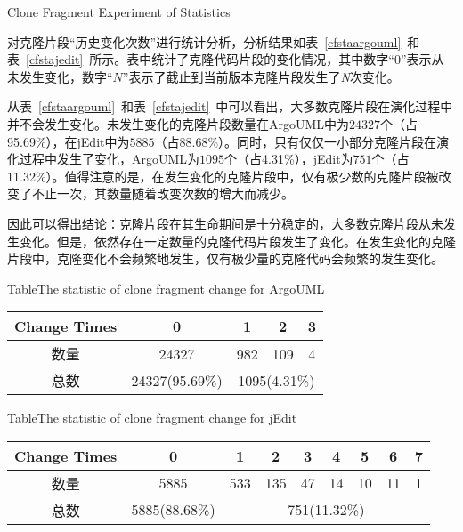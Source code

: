 {Clone Fragment Experiment of Statistics}

对克隆片段“历史变化次数”进行统计分析，分析结果如表~\ref{cfstaargouml}~和表~\ref{cfstajedit}~所示。表中统计了克隆代码片段的变化情况，其中数字“$0$”表示从未发生变化，数字“$N$”表示了截止到当前版本克隆片段发生了{\emph N\/}次变化。

从表~\ref{cfstaargouml}~和表~\ref{cfstajedit}~中可以看出，大多数克隆片段在演化过程中并不会发生变化。未发生变化的克隆片段数量在ArgoUML中为$24327$个（占95.69\%），在jEdit中为$5885$（占88.68\%）。同时，只有仅仅一小部分克隆片段在演化过程中发生了变化，ArgoUML为$1095$个（占4.31\%），jEdit为$751$个（占11.32\%）。值得注意的是，在发生变化的克隆片段中，仅有极少数的克隆片段被改变了不止一次，其数量随着改变次数的增大而减少。

 因此可以得出结论：克隆片段在其生命期间是十分稳定的，大多数克隆片段从未发生变化。但是，依然存在一定数量的克隆代码片段发生了变化。在发生变化的克隆片段中，克隆变化不会频繁地发生，仅有极少量的克隆代码会频繁的发生变化。

\begin{table}[htbp]
{Table$\!$}{The statistic of clone fragment change for ArgoUML}
\vspace{0.5em}
\centering
\wuhao
\begin{tabular}{ccccc}
\toprule[1.5pt]
Change Times&0&1&2&3\\ 
\midrule[1pt]
数量&24327&982&109&4\\ 
\cline{3-5}
总数&24327(95.69\%)&\multicolumn{3}{c}{1095(4.31\%)} \\
\bottomrule[1.5pt]
\end{tabular}
\end{table}

\begin{table}[htbp]
{Table$\!$}{The statistic of clone fragment change for jEdit}
\vspace{0.5em}
\centering
\wuhao
\begin{tabular}{ccccccccc}
\toprule[1.5pt]
Change Times &0&1&2&3&4&5&6&7\\ 
\midrule[1pt]
数量&5885&533&135&47&14&10&11&1\\ 
\cline{3-9}
总数&5885(88.68\%)&\multicolumn{7}{c}{751(11.32\%)}   \\ 
\bottomrule[1.5pt]
\end{tabular}
\end{table}

